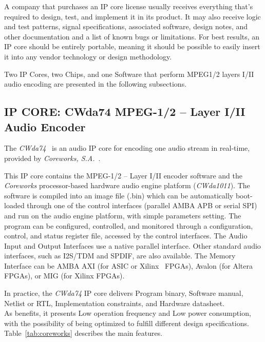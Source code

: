 A company that purchases an IP core license usually receives everything that's required to design, test, and implement it in its product. It may also receive logic and test patterns, signal specifications, associated software, design notes, and other documentation and a list of known bugs or limitations.
For best results, an IP core should be entirely portable, meaning it should be possible to easily insert it into any vendor technology or design methodology.

Two IP Cores, two Chips, and one Software that perform MPEG1/2 layers I/II audio encoding are presented in the following subsections.

\subsection{IP CORE: CWda74 MPEG-1/2 – Layer I/II Audio Encoder}

The \textit{CWda74}~\cite{CWda74} is an audio IP core for encoding one audio stream in real-time, provided by \textit{Coreworks, S.A.}~\cite{coreworks}.

This IP core contains the MPEG-1/2 – Layer I/II encoder software and the \textit{Coreworks} processor-based hardware audio engine platform (\textit{CWda1011}).
The software is compiled into an image file (.bin) which can be automatically boot-loaded through one of the control interfaces (parallel AMBA APB or serial SPI) and run on the audio engine platform, with simple parameters setting.
The program can be configured, controlled, and monitored through a configuration, control, and status register file, accessed by the control interfaces. The Audio Input and Output Interfaces use a native parallel interface. Other standard audio interfaces, such as I2S/TDM and SPDIF, are also available.
The Memory Interface can be AMBA AXI (for ASIC or Xilinx~\cite{xilinx} FPGAs), Avalon (for Altera~\cite{intel} FPGAs), or MIG (for Xilinx FPGAs).

In practice, the \textit{CWda74} IP core delivers Program binary, Software manual, Netlist or RTL, Implementation constraints, and Hardware datasheet.\\
As benefits, it presents Low operation frequency and Low power consumption, with the possibility of being optimized to fulfill different design specifications.
Table~\ref{tab:coreworks} describes the main features.

